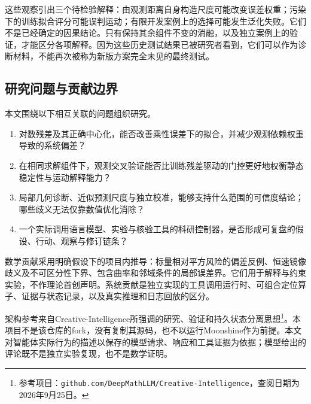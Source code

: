 这些观察引出三个待检验解释：由观测距离自身构造尺度可能改变误差权重；污染下的训练拟合评分可能误判运动；有限开发案例上的选择可能发生泛化失败。它们不是已经确定的因果结论。只有保持其余组件不变的消融，以及独立案例上的验证，才能区分各项解释。因为这些历史测试结果已被研究者看到，它们可以作为诊断材料，不能再次被称为新版方案完全未见的最终测试。

\subsection{研究问题与贡献边界}

本文围绕以下相互关联的问题组织研究。
\begin{enumerate}
  \item 对数残差及其正确中心化，能否改善乘性误差下的拟合，并减少观测依赖权重导致的系统偏差？
  \item 在相同求解组件下，观测交叉验证能否比训练残差驱动的门控更好地权衡静态稳定性与运动解释能力？
  \item 局部几何诊断、近似预测尺度与独立校准，能够支持什么范围的可信度结论；哪些歧义无法仅靠数值优化消除？
  \item 一个实际调用语言模型、实验与核验工具的科研控制器，是否形成可复盘的假设、行动、观察与修订链条？
\end{enumerate}

数学贡献采用明确假设下的项目内推导：标量相对平方风险的偏差反例、恒速镜像歧义及不可区分性下界、包含曲率和邻域条件的局部误差界。它们用于解释与约束实验，不作理论首创声明。系统贡献是独立实现的工具调用运行时、可组合定位算子、证据与状态记录，以及真实推理和日志回放的区分。

架构参考来自Creative-Intelligence所强调的研究、验证和持久状态分离思想\footnote{参考项目：\texttt{github.com/DeepMathLLM/Creative-Intelligence}，查阅日期为2026年9月25日。}。本项目不是该仓库的fork，没有复制其源码，也不以运行Moonshine作为前提。本文对智能体实际行为的描述以保存的模型请求、响应和工具证据为依据；模型给出的评论既不是独立实验复现，也不是数学证明。
